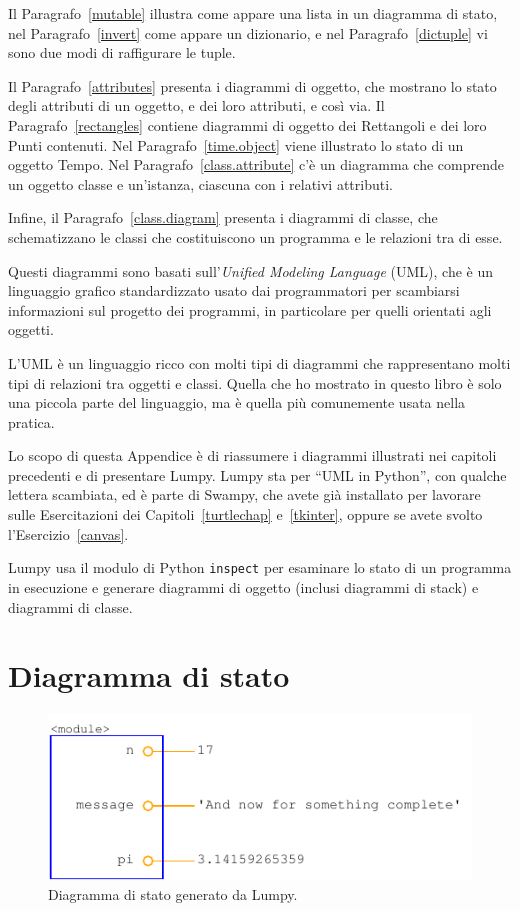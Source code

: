 \documentclass[10pt]{book}
\begin{document}
Il Paragrafo~\ref{mutable} illustra come appare una lista in un diagramma di stato, nel Paragrafo~\ref{invert} come appare un dizionario, e nel Paragrafo~\ref{dictuple} vi sono due modi di raffigurare le tuple.

Il Paragrafo~\ref{attributes} presenta i diagrammi di oggetto, che mostrano lo stato degli attributi di un oggetto, e dei loro attributi, e così via. Il Paragrafo~\ref{rectangles} contiene diagrammi di oggetto dei Rettangoli e dei loro Punti contenuti. Nel Paragrafo~\ref{time.object} viene illustrato lo stato di un oggetto Tempo.
Nel Paragrafo~\ref{class.attribute} c'è un diagramma che comprende un oggetto classe e un'istanza, ciascuna con i relativi attributi.


Infine, il Paragrafo~\ref{class.diagram} presenta i diagrammi di classe, che schematizzano le classi che costituiscono un programma e le relazioni tra di esse.

Questi diagrammi sono basati sull'{\em Unified Modeling Language} (UML), che è un linguaggio grafico standardizzato usato dai programmatori per scambiarsi informazioni sul progetto dei programmi, in particolare per quelli orientati agli oggetti.

L'UML è un linguaggio ricco con molti tipi di diagrammi che rappresentano molti tipi di relazioni tra oggetti e classi. Quella che ho mostrato in questo libro è solo una piccola parte del linguaggio, ma è quella più comunemente usata nella pratica.

Lo scopo di questa Appendice è di riassumere i diagrammi illustrati nei capitoli precedenti e di presentare Lumpy. Lumpy sta per ``UML in Python'', con qualche lettera scambiata, ed è parte di Swampy, che avete già installato per lavorare sulle Esercitazioni dei Capitoli~\ref{turtlechap} e~\ref{tkinter}, oppure se avete svolto l'Esercizio~\ref{canvas}.

Lumpy usa il modulo di Python {\tt inspect} per esaminare lo stato di un programma in esecuzione e generare diagrammi di oggetto (inclusi diagrammi di stack) e diagrammi di classe.

\section{Diagramma di stato}

\begin{figure}
\centerline
{\includegraphics[scale=0.7]{figs/lumpydemo1.pdf}}
\caption{Diagramma di stato generato da Lumpy.}
\label{fig.lumpy1}
\end{figure}
\end{document}
